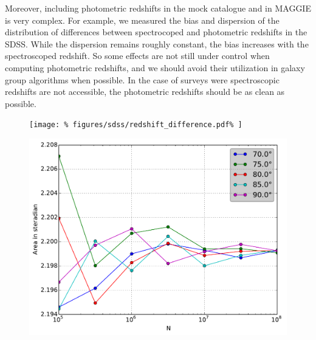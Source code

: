 Moreover, including photometric redshifts in the mock catalogue and in MAGGIE
is very complex. For example, we measured the bias and dispersion of the
distribution of differences between spectrocoped and photometric redshifts in
the SDSS\@. While the dispersion remains roughly constant, the bias increases
with the spectroscoped redshift. So some effects are not still under control
when computing photometric redshifts, and we should avoid their utilization in
galaxy group algorithms when possible. In the case of surveys were
spectroscopic redshifts are not accessible, the photometric redshifts should be
as clean as possible.
%
\begin{figure}[hp]
    \begin{minipage}{\linewidth}
        \centering
        \texttt{[image: \%
            figures/sdss/redshift\_difference.pdf\%
        ]}
    \end{minipage}
    \begin{minipage}{\linewidth}
        \centering
        \includegraphics[height=0.4\textheight]{figures/sdss/SDSS_area}
    \end{minipage}
\end{figure}

